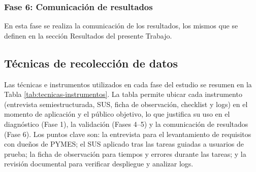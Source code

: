   \subsubsection{Fase 6: Comunicación de resultados} En esta fase se realiza la comunicación de los resultados, los mismos que se definen en la sección Resultados del presente Trabajo.













  
  


  \subsection{Técnicas de recolección de datos}

  Las técnicas e instrumentos utilizados en cada fase del estudio se resumen en la Tabla \ref{tab:tecnicas-instrumentos}. La tabla permite ubicar cada instrumento (entrevista semiestructurada, SUS, ficha de observación, checklist y logs) en el momento de aplicación y el público objetivo, lo que justifica su uso en el diagnóstico (Fase 1), la validación (Fases 4--5) y la comunicación de resultados (Fase 6). Los puntos clave son: la entrevista para el levantamiento de requisitos con dueños de PYMES; el SUS aplicado tras las tareas guiadas a usuarios de prueba; la ficha de observación para tiempos y errores durante las tareas; y la revisión documental para verificar despliegue y analizar logs.

